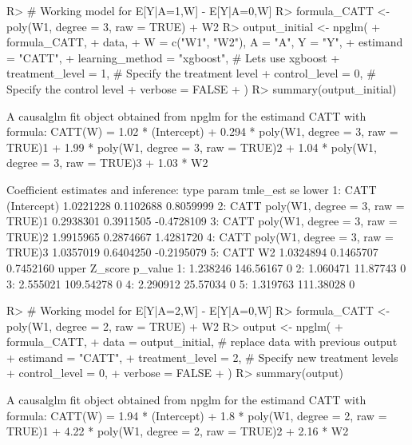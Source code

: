 \documentclass[
]{jss}
\begin{document}
\begin{CodeChunk}
\begin{CodeInput}
R> # Working model for E[Y|A=1,W] - E[Y|A=0,W]
R> formula_CATT <- ~ poly(W1, degree = 3, raw = TRUE) + W2
R> output_initial <- npglm(
+       formula_CATT, 
+       data,
+       W = c("W1", "W2"), A = "A", Y = "Y",
+       estimand = "CATT", 
+       learning_method = "xgboost", # Lets use xgboost
+       treatment_level = 1, # Specify the treatment level
+       control_level = 0, # Specify the control level
+       verbose = FALSE
+       )
R> summary(output_initial)
\end{CodeInput}
\begin{CodeOutput}
A causalglm fit object obtained from npglm for the estimand CATT with formula: 
CATT(W) = 1.02 * (Intercept) + 0.294 * poly(W1, degree = 3, raw = TRUE)1 + 1.99 * poly(W1, degree = 3, raw = TRUE)2 + 1.04 * poly(W1, degree = 3, raw = TRUE)3 + 1.03 * W2

Coefficient estimates and inference:
   type                             param  tmle_est        se      lower
1: CATT                       (Intercept) 1.0221228 0.1102688  0.8059999
2: CATT poly(W1, degree = 3, raw = TRUE)1 0.2938301 0.3911505 -0.4728109
3: CATT poly(W1, degree = 3, raw = TRUE)2 1.9915965 0.2874667  1.4281720
4: CATT poly(W1, degree = 3, raw = TRUE)3 1.0357019 0.6404250 -0.2195079
5: CATT                                W2 1.0324894 0.1465707  0.7452160
      upper   Z_score p_value
1: 1.238246 146.56167       0
2: 1.060471  11.87743       0
3: 2.555021 109.54278       0
4: 2.290912  25.57034       0
5: 1.319763 111.38028       0
\end{CodeOutput}
\begin{CodeInput}
R> # Working model for E[Y|A=2,W] - E[Y|A=0,W]
R> formula_CATT <- ~ poly(W1, degree = 2, raw = TRUE) + W2
R> output <- npglm(
+       formula_CATT, 
+       data = output_initial, # replace data with previous output
+       estimand = "CATT", 
+       treatment_level = 2,  # Specify new treatment levels
+       control_level = 0,
+       verbose = FALSE
+       )
R> summary(output)
\end{CodeInput}
\begin{CodeOutput}
A causalglm fit object obtained from npglm for the estimand CATT with formula: 
CATT(W) = 1.94 * (Intercept) + 1.8 * poly(W1, degree = 2, raw = TRUE)1 + 4.22 * poly(W1, degree = 2, raw = TRUE)2 + 2.16 * W2


\end{CodeOutput}
\end{CodeChunk}
\end{document}
